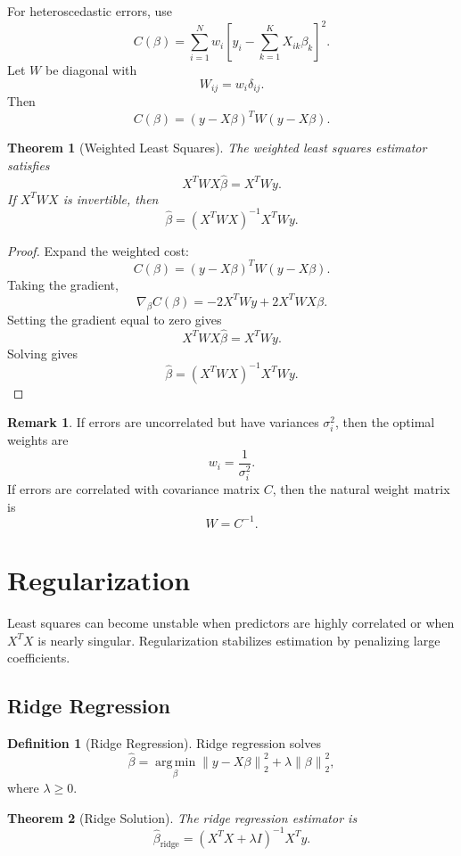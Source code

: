\documentclass[12pt,oneside]{book}
\numberwithin{equation}{section}
\theoremstyle{definition}
\newtheorem{definition}{Definition}[section]
\newtheorem{remark}{Remark}[section]
\theoremstyle{plain}
\newtheorem{theorem}{Theorem}[section]
\theoremstyle{remark}
\newcommand{\argmin}{\operatorname*{arg\,min}}
\newcommand{\norm}[1]{\left\lVert #1 \right\rVert}
\newcommand{\grad}{\nabla}
\begin{document}
For heteroscedastic errors, use
\[
C(\beta)
=
\sum_{i=1}^N
w_i
\left[
y_i-\sum_{k=1}^K X_{ik}\beta_k
\right]^2.
\]
Let $W$ be diagonal with
\[
W_{ij}=w_i\delta_{ij}.
\]
Then
\[
C(\beta)
=
(y-X\beta)^TW(y-X\beta).
\]

\begin{theorem}[Weighted Least Squares]
The weighted least squares estimator satisfies
\[
X^TWX\hat{\beta}=X^TWy.
\]
If $X^TWX$ is invertible, then
\[
\hat{\beta}
=
(X^TWX)^{-1}X^TWy.
\]
\end{theorem}

\begin{proof}
Expand the weighted cost:
\[
C(\beta)
=
(y-X\beta)^TW(y-X\beta).
\]
Taking the gradient,
\[
\grad_\beta C(\beta)
=
-2X^TWy+2X^TWX\beta.
\]
Setting the gradient equal to zero gives
\[
X^TWX\hat{\beta}=X^TWy.
\]
Solving gives
\[
\hat{\beta}
=
(X^TWX)^{-1}X^TWy.
\]
\end{proof}

\begin{remark}
If errors are uncorrelated but have variances $\sigma_i^2$, then the optimal weights are
\[
w_i=\frac{1}{\sigma_i^2}.
\]
If errors are correlated with covariance matrix $C$, then the natural weight matrix is
\[
W=C^{-1}.
\]
\end{remark}

\section{Regularization}

Least squares can become unstable when predictors are highly correlated or when $X^TX$ is nearly singular. Regularization stabilizes estimation by penalizing large coefficients.

\subsection{Ridge Regression}

\begin{definition}[Ridge Regression]
Ridge regression solves
\[
\hat{\beta}
=
\argmin_{\beta}
\norm{y-X\beta}_2^2
+
\lambda\norm{\beta}_2^2,
\]
where $\lambda \geq 0$.
\end{definition}

\begin{theorem}[Ridge Solution]
The ridge regression estimator is
\[
\hat{\beta}_{\mathrm{ridge}}
=
(X^TX+\lambda I)^{-1}X^Ty.
\]
\end{theorem}
\end{document}
